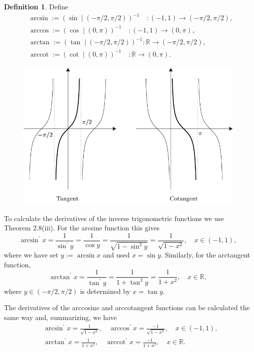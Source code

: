 \documentclass[12pt,a4paper]{book}
\theoremstyle{definition}
\newtheorem{defn}{Definition}[section]
\begin{document}
\begin{defn}
    Define
    $$
    \begin{aligned}
    & \arcsin :=(\sin \mid(-\pi / 2, \pi / 2))^{-1} \quad:(-1,1) \rightarrow(-\pi / 2, \pi / 2), \\
    & \arccos :=(\cos \mid(0, \pi))^{-1} \quad:(-1,1) \rightarrow(0, \pi), \\
    & \arctan :=(\tan \mid(-\pi / 2, \pi / 2))^{-1}: \mathbb{R} \rightarrow(-\pi / 2, \pi / 2) \text {, } \\
    & \operatorname{arccot}:=(\cot \mid(0, \pi))^{-1} \quad: \mathbb{R} \rightarrow(0, \pi) .
    \end{aligned}
    $$
        \begin{figure}
            \includegraphics[height=0.4\textheight]{tang.png}
        \end{figure}
    To calculate the derivatives of the inverse trigonometric functions we use Theorem 2.8(iii). For the arcsine function this gives
    $$
    \arcsin ^{\prime} x=\frac{1}{\sin ^{\prime} y}=\frac{1}{\cos y}=\frac{1}{\sqrt{1-\sin ^2 y}}=\frac{1}{\sqrt{1-x^2}}, \quad x \in(-1,1),
    $$
    where we have set $y:=\arcsin x$ and used $x=\sin y$. Similarly, for the arctangent function,
    $$
    \arctan ^{\prime} x=\frac{1}{\tan ^{\prime} y}=\frac{1}{1+\tan ^2 y}=\frac{1}{1+x^2}, \quad x \in \mathbb{R},
    $$ 
    where $y \in(-\pi / 2, \pi / 2)$ is determined by $x=\tan y$.
    
    The derivatives of the arccosine and arccotangent functions can be calculated the same way and, summarizing, we have
    $$
    \begin{aligned}
    & \arcsin ^{\prime} x=\frac{1}{\sqrt{1-x^2}}, \quad \arccos ^{\prime} x=\frac{-1}{\sqrt{1-x^2}}, \quad x \in(-1,1), \\
    & \arctan ^{\prime} x=\frac{1}{1+x^2}, \quad \operatorname{arccot}^{\prime} x=\frac{-1}{1+x^2}, \quad x \in \mathbb{R} .
    \end{aligned}
    $$
\end{defn}
\end{document}
